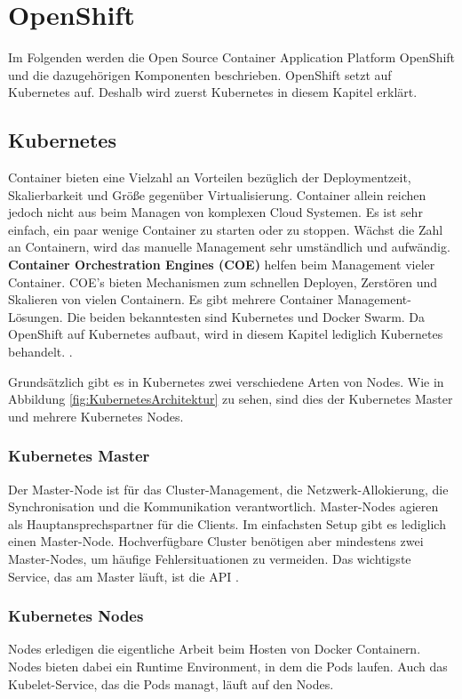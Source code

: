 \chapter{OpenShift}
Im Folgenden werden die Open Source Container Application Platform OpenShift und die dazugehörigen Komponenten beschrieben. OpenShift setzt auf Kubernetes auf. Deshalb wird zuerst Kubernetes in diesem Kapitel erklärt.

\section{Kubernetes}
Container bieten eine Vielzahl an Vorteilen bezüglich der Deploymentzeit, Skalierbarkeit und Größe gegenüber Virtualisierung. Container allein reichen jedoch nicht aus beim Managen von komplexen Cloud Systemen. Es ist sehr einfach, ein paar wenige Container zu starten oder zu stoppen. Wächst die Zahl an Containern, wird das manuelle Management sehr umständlich und aufwändig. \textbf{Container Orchestration Engines (COE)} helfen beim Management vieler Container. COE's bieten Mechanismen zum schnellen Deployen, Zerstören und Skalieren von vielen Containern. Es gibt mehrere Container Management-Lösungen. Die beiden bekanntesten sind Kubernetes und Docker Swarm. Da OpenShift auf Kubernetes aufbaut, wird in diesem Kapitel lediglich Kubernetes behandelt. \cite{LearnOpenShift}.

Grundsätzlich gibt es in Kubernetes zwei verschiedene Arten von Nodes. Wie in Abbildung \ref{fig:KubernetesArchitektur} zu sehen, sind dies der Kubernetes Master und mehrere Kubernetes Nodes.

\subsection{Kubernetes Master}
Der Master-Node ist für das Cluster-Management, die Netzwerk-Allokierung, die Synchronisation und die Kommunikation verantwortlich. Master-Nodes agieren als Hauptansprechspartner für die Clients. Im einfachsten Setup gibt es lediglich einen Master-Node. Hochverfügbare Cluster benötigen aber mindestens zwei Master-Nodes, um häufige Fehlersituationen zu vermeiden. Das wichtigste Service, das am Master läuft, ist die API \cite{LearnOpenShift}.

\subsection{Kubernetes Nodes}
Nodes erledigen die eigentliche Arbeit beim Hosten von Docker Containern. Nodes bieten dabei ein Runtime Environment, in dem die Pods laufen. Auch das Kubelet-Service, das die Pods managt, läuft auf den Nodes.

